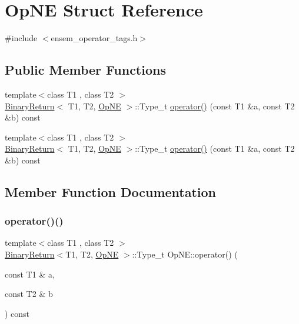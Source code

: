 \hypertarget{structOpNE}{}\section{Op\+NE Struct Reference}
\label{structOpNE}


{\ttfamily \#include $<$ensem\+\_\+operator\+\_\+tags.\+h$>$}

\subsection*{Public Member Functions}
\begin{DoxyCompactItemize}
\item 
{\footnotesize template$<$class T1 , class T2 $>$ }\\\mbox{\hyperlink{structBinaryReturn}{Binary\+Return}}$<$ T1, T2, \mbox{\hyperlink{structOpNE}{Op\+NE}} $>$\+::Type\+\_\+t \mbox{\hyperlink{structOpNE_ae32186e8a2a30c388bbe8af0eea8e4c2}{operator()}} (const T1 \&a, const T2 \&b) const
\item 
{\footnotesize template$<$class T1 , class T2 $>$ }\\\mbox{\hyperlink{structBinaryReturn}{Binary\+Return}}$<$ T1, T2, \mbox{\hyperlink{structOpNE}{Op\+NE}} $>$\+::Type\+\_\+t \mbox{\hyperlink{structOpNE_ae32186e8a2a30c388bbe8af0eea8e4c2}{operator()}} (const T1 \&a, const T2 \&b) const
\end{DoxyCompactItemize}


\subsection{Member Function Documentation}
\mbox{\label{structOpNE_ae32186e8a2a30c388bbe8af0eea8e4c2}} 
\subsubsection{\texorpdfstring{operator()()}{operator()()}\hspace{0.1cm}{\footnotesize\ttfamily [1/2]}}
{\footnotesize\ttfamily template$<$class T1 , class T2 $>$ \\
\mbox{\hyperlink{structBinaryReturn}{Binary\+Return}}$<$T1, T2, \mbox{\hyperlink{structOpNE}{Op\+NE}} $>$\+::Type\+\_\+t Op\+N\+E\+::operator() (\begin{DoxyParamCaption}\item[{const T1 \&}]{a,  }\item[{const T2 \&}]{b }\end{DoxyParamCaption}) const\hspace{0.3cm}{\ttfamily [inline]}}

